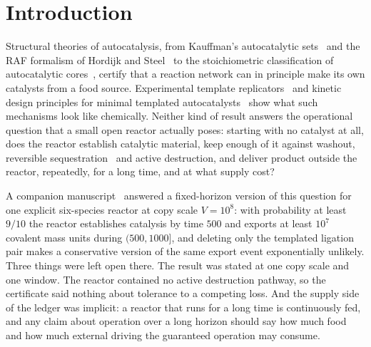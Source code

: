 \documentclass[11pt,a4paper]{article}
\theoremstyle{plain}
\theoremstyle{definition}
\theoremstyle{remark}
\begin{document}
\section{Introduction}\label{sec:intro}

Structural theories of autocatalysis, from Kauffman's autocatalytic sets~\citep{kauffman1986} and the RAF formalism of Hordijk and Steel~\citep{hordijk2004,steel2019} to the stoichiometric classification of autocatalytic cores~\citep{blokhuis2020}, certify that a reaction network can in principle make its own catalysts from a food source. Experimental template replicators~\citep{vonkiedrowski1986,sievers1994,lincoln2009} and kinetic design principles for minimal templated autocatalysts~\citep{sakref2024} show what such mechanisms look like chemically. Neither kind of result answers the operational question that a small open reactor actually poses: starting with no catalyst at all, does the reactor establish catalytic material, keep enough of it against washout, reversible sequestration~\citep{szathmary1989} and active destruction, and deliver product outside the reactor, repeatedly, for a long time, and at what supply cost?

A companion manuscript~\citep{predecessor2026} answered a fixed-horizon version of this question for one explicit six-species reactor at copy scale $V=10^8$: with probability at least $9/10$ the reactor establishes catalysis by time $500$ and exports at least $10^7$ covalent mass units during $(500,1000]$, and deleting only the templated ligation pair makes a conservative version of the same export event exponentially unlikely. Three things were left open there. The result was stated at one copy scale and one window. The reactor contained no active destruction pathway, so the certificate said nothing about tolerance to a competing loss. And the supply side of the ledger was implicit: a reactor that runs for a long time is continuously fed, and any claim about operation over a long horizon should say how much food and how much external driving the guaranteed operation may consume.
\end{document}
